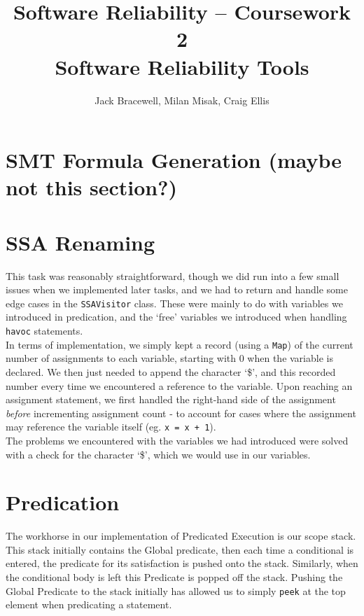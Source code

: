 \documentclass[11pt]{article}
\title{Software Reliability -- Coursework 2 \\ Software Reliability Tools}
\author{Jack Bracewell, Milan Misak, Craig Ellis}
\date{}
\begin{document}
\maketitle

\section{SMT Formula Generation (maybe not this section?)}

\section{SSA Renaming}

This task was reasonably straightforward, though we did run into a few small issues when we implemented later tasks, and we had to return and handle some edge cases in the \verb|SSAVisitor| class. These were mainly to do with variables we introduced in predication, and the `free' variables we introduced when handling \verb|havoc| statements. \\

In terms of implementation, we simply kept a record (using a \verb|Map|) of the current number of assignments to each variable, starting with 0 when the variable is declared. We then just needed to append the character `\$', and this recorded number every time we encountered a reference to the variable. Upon reaching an assignment statement, we first handled the right-hand side of the assignment \emph{before} incrementing assignment count - to account for cases where the assignment may reference the variable itself (eg. \verb|x = x + 1|). \\

The problems we encountered with the variables we had introduced were solved with a check for the character `\$', which we would use in our variables. \\

\section{Predication}

The workhorse in our implementation of Predicated Execution is our scope stack. This stack initially contains the Global predicate, then each time a conditional is entered, the predicate for its satisfaction is pushed onto the stack. Similarly, when the conditional body is left this Predicate is popped off the stack. Pushing the Global Predicate to the stack initially has allowed us to simply \verb|peek| at the top element when predicating a statement. \\
\end{document}
